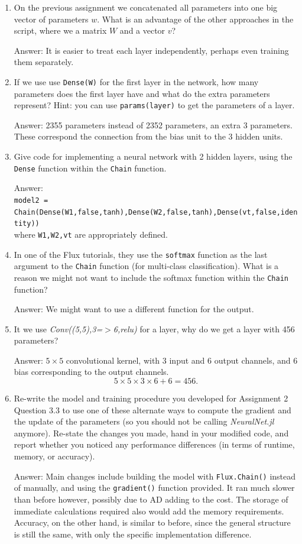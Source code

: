 \documentclass{article}
\def\ans#1{\par\gre{Answer: #1}}
\def\blu#1{{\color{blu}#1}}
\def\gre#1{{\color{gre}#1}}
\def\enum#1{\begin{enumerate}#1\end{enumerate}}
\begin{document}
\enum{
\item On the previous assignment we concatenated all parameters into one big vector of parameters $w$. \blu{What is an advantage of the other approaches in the script, where we a matrix $W$ and a vector $v$?}
\ans{
It is easier to treat each layer independently, perhaps even training them separately.
}
\item \blu{If we use use \texttt{Dense(W)} for the first layer in the network, how many parameters does the first layer have and what do the extra parameters represent?} Hint: you can use \texttt{params(layer)} to get the parameters of a layer.
\ans{
2355 parameters instead of 2352 parameters, an extra 3 parameters. These correspond the connection from the bias unit to the 3 hidden units.
}
\item \blu{Give code for implementing a neural network with 2 hidden layers, using the \texttt{Dense} function within the \texttt{Chain} function.}
\ans{\\
\texttt{model2 = Chain(Dense(W1,false,tanh),Dense(W2,false,tanh),Dense(vt,false,identity))}\\
where \texttt{W1,W2,vt} are appropriately defined.
}
\item In one of the Flux tutorials, they use the \texttt{softmax} function as the last argument to the \texttt{Chain} function (for multi-class classification). \blu{What is a reason we might not want to include the softmax function within the \texttt{Chain} function?}
\ans{
We might want to use a different function for the output.
}
\item It we use \emph{Conv((5,5),3=$>$6,relu)} for a layer, \blu{why do we get a layer with 456 parameters}?
\ans{
$5\times5$ convolutional kernel, with 3 input and 6 output channels, and 6 bias corresponding to the output channels.
\[5\times 5\times 3\times 6 + 6 = 456.\]
}
\pagebreak
\item Re-write the model and training procedure you developed for Assignment 2 Question 3.3 to use one of these alternate ways to compute the gradient and the update of the parameters (so you should not be calling \emph{NeuralNet.jl} anymore). \blu{Re-state the changes you made, hand in your modified code, and report whether you noticed any performance differences (in terms of runtime, memory, or accuracy).}
\ans{
Main changes include building the model with \texttt{Flux.Chain()} instead of manually, and using the \texttt{gradient()} function provided. It ran much slower than before however, possibly due to AD adding to the cost. The storage of immediate calculations required also would add the memory requirements. Accuracy, on the other hand, is similar to before, since the general structure is still the same, with only the specific implementation difference.

}
}
\end{document}
